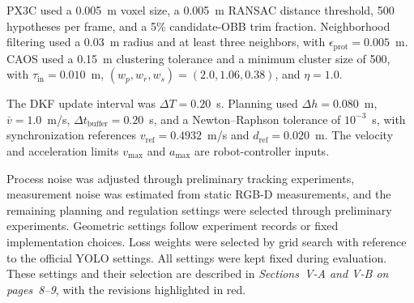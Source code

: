 \documentclass[journal,10pt]{IEEEtran}
\begin{document}
PX3C used a 0.005~m voxel size, a 0.005~m RANSAC distance threshold, 500 hypotheses per frame, and a 5\% candidate-OBB trim fraction. Neighborhood filtering used a 0.03~m radius and at least three neighbors, with $\epsilon_{\mathrm{prot}}=0.005$~m. CAOS used a 0.15~m clustering tolerance and a minimum cluster size of 500, with $\tau_{\mathrm{in}}=0.010$~m, $(w_p,w_r,w_s)=(2.0,1.06,0.38)$, and $\eta=1.0$.

The DKF update interval was $\Delta T=0.20$~s. Planning used $\Delta h=0.080$~m, $\bar v=1.0$~m/s, $\Delta t_{\mathrm{buffer}}=0.20$~s, and a Newton--Raphson tolerance of $10^{-3}$~s, with synchronization references $v_{\mathrm{ref}}=0.4932$~m/s and $d_{\mathrm{ref}}=0.020$~m. The velocity and acceleration limits $v_{\mathrm{max}}$ and $a_{\mathrm{max}}$ are robot-controller inputs.

Process noise was adjusted through preliminary tracking experiments, measurement noise was estimated from static RGB-D measurements, and the remaining planning and regulation settings were selected through preliminary experiments. Geometric settings follow experiment records or fixed implementation choices. Loss weights were selected by grid search with reference to the official YOLO settings. All settings were kept fixed during evaluation. These settings and their selection are described in \textit{Sections~V-A and V-B on pages~8--9}, with the revisions highlighted in red.
\end{document}
